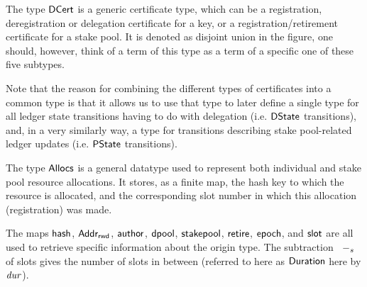 The type $\mathsf{DCert}$ is a generic certificate type, which can be a registration,
deregistration or delegation certificate for a key, or a registration/retirement
 certificate for a stake pool. It is denoted as disjoint union in the figure,
one should, however, think of a term of this type as a term of a specific
one of these five subtypes.

Note that the reason for combining the different types of
certificates into a common type is that it allows us to use that type to later
define a single type for all
ledger state transitions having to do with delegation (i.e. $\mathsf{DState}$
transitions),
and, in a very similarly
way, a type for transitions describing stake pool-related ledger updates
(i.e. $\mathsf{PState}$ transitions).

The type $\mathsf{Allocs}$ is a general datatype used to represent both individual and stake
pool resource allocations. It stores, as a finite map, the hash key to which the resource is
allocated, and the corresponding slot number in which this allocation
(registration) was made.

The maps $\mathsf{hash}$, $\mathsf{Addr_{rwd}}$, $\mathsf{author}$, $\mathsf{dpool}$,
$\mathsf{stakepool}$,
$\mathsf{retire}$, $\mathsf{epoch}$, and $\mathsf{slot}$ are all used to
retrieve specific information about the origin type. The subtraction $\mathit{}~-_{s}~\mathit{}$
of slots gives the number of slots in between (referred to here as
$\mathsf{Duration}$ here by $\mathit{dur}$).



